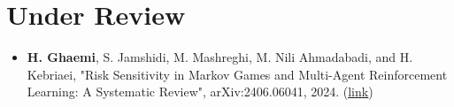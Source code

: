 \documentclass[A4,11pt]{article}
\makeatletter
\newcommand{\CVItem}[1]{
  \item\small{
    {#1 \vspace{-2pt}}
  }
}
\newcommand{\CVSubheading}[4]{
  \vspace{-2pt}\item
    \begin{tabular*}{0.97\textwidth}[t]{l@{\extracolsep{\fill}}r}
      \textbf{#1} & #2 \\
      \small#3 & \small #4 \\
    \end{tabular*}\vspace{-7pt}
}
\newcommand{\CVItemListStart}{\begin{itemize}}
\newcommand{\CVItemListEnd}{\end{itemize}\vspace{-5pt}}
\makeatother
\begin{document}


\section{Under Review}
\CVItemListStart
\CVItem{\textbf{H. Ghaemi}, S. Jamshidi, M. Mashreghi, M. Nili Ahmadabadi, and H. Kebriaei, "Risk Sensitivity in Markov Games and Multi-Agent Reinforcement Learning: A Systematic Review", arXiv:2406.06041, 2024. (\href{https://arxiv.org/abs/2406.06041}{\underline{link}})}
\CVItemListEnd
\end{document}
